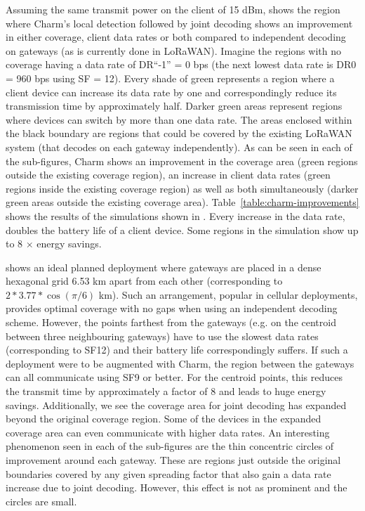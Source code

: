 Assuming the same transmit power on the client of 15 dBm,
 shows the region where Charm's local detection
followed by joint decoding shows an improvement in either coverage, client
data rates or both compared to independent decoding on gateways (as is
currently done in LoRaWAN). Imagine the regions with no coverage having a data
rate of DR``-1'' = 0 bps (the next lowest data rate is DR0 = 960 bps using SF
= 12). Every shade of green represents a region where a client device can
increase its data rate by one and correspondingly reduce its transmission time
by approximately half. Darker green areas represent regions where devices can
switch by more than one data rate. The areas enclosed within the black
boundary are regions that could be covered by the existing LoRaWAN system
(that decodes on each gateway independently). As can be seen in each of the
sub-figures, Charm shows an improvement in the coverage area (green regions
outside the existing coverage region), an increase in client data rates (green
regions inside the existing coverage region) as well as both simultaneously
(darker green areas outside the existing coverage area).
Table~\ref{table:charm-improvements} shows the results of the simulations
shown in . Every increase in the data rate, doubles
the battery life of a client device. Some regions in the simulation show up to
8 $\times$ energy savings.

 shows an ideal planned deployment where gateways
are placed in a dense hexagonal grid 6.53 km apart from each other
(corresponding to $2*3.77*\cos(\pi/6)$ km). Such an arrangement, popular in
cellular deployments, provides optimal coverage with no gaps when using an
independent decoding scheme. However, the points farthest from the gateways
(e.g. on the centroid between three neighbouring gateways) have to use the
slowest data rates (corresponding to SF12) and their battery life
correspondingly suffers. If such a deployment were to be augmented with Charm,
the region between the gateways can all communicate using SF9 or better. For
the centroid points, this reduces the transmit time by approximately a factor
of 8 and leads to huge energy savings. Additionally, we see the coverage area
for joint decoding has expanded beyond the original coverage region. Some of
the devices in the expanded coverage area can even communicate with higher
data rates. An interesting phenomenon seen in each of the sub-figures are the
thin concentric circles of improvement around each gateway. These are regions
just outside the original boundaries covered by any given spreading factor
that also gain a data rate increase due to joint decoding. However, this
effect is not as prominent and the circles are small.

